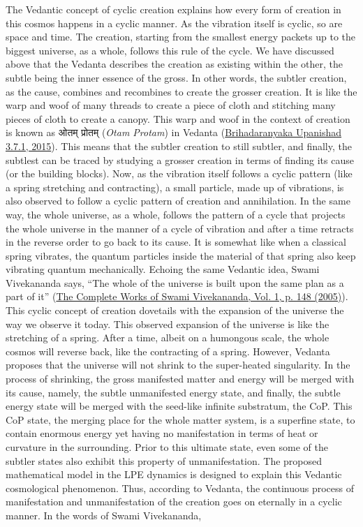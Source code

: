 \documentclass[twoside, 13pt]{article}
\begin{document}
{{\fontsize{12}{14}\selectfont The Vedantic concept of cyclic creation explains how every form of creation in this cosmos happens in a cyclic manner. As the vibration itself is cyclic, so are space and time. The creation, starting from the smallest energy packets up to the biggest universe, as a whole, follows this rule of the cycle. We have discussed above that the Vedanta describes the creation as existing within the other, the subtle being the inner essence of the gross. In other words, the subtler creation, as the cause, combines and recombines to create the grosser creation. It is like the warp and woof of many threads to create a piece of cloth and stitching many pieces of cloth to create a canopy. This warp and woof in the context of creation is known as \foreignlanguage{hindi}{{\fontsize{9}{11}\selectfont ओतम् प्रोतम् }}(\textit{Otam Protam}) in Vedanta (\underline{Brihadaranyaka Upanishad 3.7.1, 2015}).  This means that the subtler creation to still subtler, and finally, the subtlest can be traced by studying a grosser creation in terms of finding its cause (or the building blocks). Now, as the vibration itself follows a cyclic pattern (like a spring stretching and contracting), a small particle, made up of vibrations, is also observed to follow a cyclic pattern of creation and annihilation. In the same way, the whole universe, as a whole, follows the pattern of a cycle that projects the whole universe in the manner of a cycle of vibration and after a time retracts in the reverse order to go back to its cause. It is somewhat like when a classical spring vibrates, the quantum particles inside the material of that spring also keep vibrating quantum mechanically. Echoing the same Vedantic idea, Swami Vivekananda says, “The whole of the universe is built upon the same plan as a part of it” (\underline{The Complete Works of Swami Vivekananda, Vol. 1, p. 148 (2005)}). This cyclic concept of creation dovetails with the expansion of the universe the way we observe it today. This observed expansion of the universe is like the stretching of a spring. After a time, albeit on a humongous scale, the whole cosmos will reverse back, like the contracting of a spring. However, Vedanta proposes that the universe will not shrink to the super-heated singularity. In the process of shrinking, the gross manifested matter and energy will be merged with its cause, namely, the subtle unmanifested energy state, and finally, the subtle energy state will be merged with the seed-like infinite substratum, the CoP. This CoP state, the merging place for the whole matter system, is a superfine state, to contain enormous energy yet having no manifestation in terms of heat or curvature in the surrounding. Prior to this ultimate state, even some of the subtler states also exhibit this property of unmanifestation. The proposed mathematical model in the LPE dynamics is designed to explain this Vedantic cosmological phenomenon. Thus, according to Vedanta, the continuous process of manifestation and unmanifestation of the creation goes on eternally in a cyclic manner. In the words of Swami Vivekananda,
}}
\end{document}
